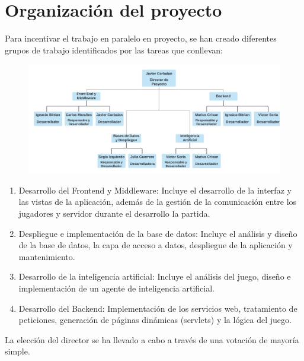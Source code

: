 \section{Organización del proyecto}
\label{organiz}

Para incentivar el trabajo en paralelo en proyecto, se han creado diferentes grupos de trabajo identificados por las tareas que conllevan:

\begin{figure}[h]
	\centering \includegraphics[scale=0.6]{figuras/organigrama.png}
\end{figure}

\begin{enumerate}
\item Desarrollo del Frontend y Middleware: Incluye el desarrollo de la interfaz y las vistas de la aplicación, además de la gestión de la comunicación entre los jugadores y servidor durante el desarrollo la partida.
\item Despliegue e implementación de la base de datos: Incluye el análisis y diseño de la base de datos, la capa de acceso a datos, despliegue de la aplicación y mantenimiento.
\item Desarrollo de la inteligencia artificial: Incluye el análisis del juego, diseño e implementación de un agente de inteligencia artificial.
\item Desarrollo del Backend: Implementación de los servicios web, tratamiento de peticiones, generación de páginas dinámicas (servlets) y la lógica del juego.
\end{enumerate}

La elección del director se ha llevado a cabo a través de una votación de mayoría simple.
